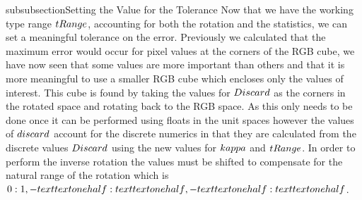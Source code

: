 subsubsection{Setting the Value for the Tolerance}
Now that we have the working type range $\\tRange$, accounting for both the rotation and the statistics, we can set a meaningful tolerance on the error. Previously we calculated that the maximum error would occur for pixel values at the corners of the RGB cube, we have now seen that some values are more important than others and that it is more meaningful to use a smaller RGB cube which encloses only the values of interest. This cube is found by taking the values for $\\Discard$ as the corners in the rotated space and rotating back to the RGB space. As this only needs to be done once it can be performed using floats in the unit spaces however the values of $\\discard$ account for the discrete numerics in that they are calculated from the discrete values $\\Discard$ using the new values for $\\kappa$ and $\\tRange$. In order to perform the inverse rotation the values must be shifted to compensate for the natural range of the rotation which is $\\{0:1,-\\text{\\textonehalf}:\\text{\\textonehalf},-\\text{\\textonehalf}:\\text{\\textonehalf}\\}$. 

